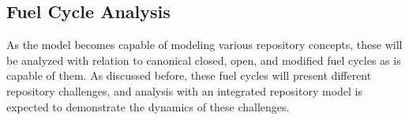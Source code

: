 \subsection{Fuel Cycle Analysis}

As the model becomes capable of modeling various repository concepts, these will  
be analyzed with relation to canonical closed, open, and modified fuel cycles as  
\Cyclus is capable of them. As discussed before, these fuel cycles will present 
different repository challenges, and analysis with an integrated repository 
model is expected to demonstrate the dynamics of these challenges.   



